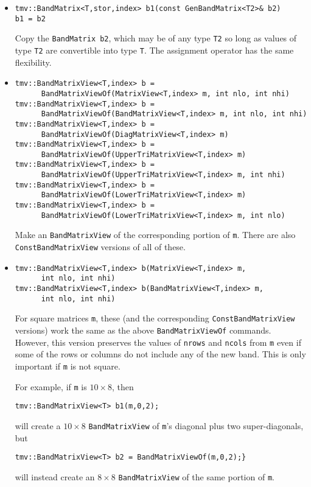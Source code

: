\documentclass[twoside,letterpaper,11pt]{article}
\renewcommand{\tt}[1]{{\texttt {#1}}}
\begin{document}
\begin{itemize}
\item
\begin{verbatim}
tmv::BandMatrix<T,stor,index> b1(const GenBandMatrix<T2>& b2)
b1 = b2
\end{verbatim}
Copy the \tt{BandMatrix b2}, which may be of any type \tt{T2} so long
as values of type \tt{T2} are convertible into type \tt{T}.
The assignment operator has the same flexibility.

\item
\begin{verbatim}
tmv::BandMatrixView<T,index> b = 
      BandMatrixViewOf(MatrixView<T,index> m, int nlo, int nhi)
tmv::BandMatrixView<T,index> b = 
      BandMatrixViewOf(BandMatrixView<T,index> m, int nlo, int nhi)
tmv::BandMatrixView<T,index> b = 
      BandMatrixViewOf(DiagMatrixView<T,index> m)
tmv::BandMatrixView<T,index> b = 
      BandMatrixViewOf(UpperTriMatrixView<T,index> m)
tmv::BandMatrixView<T,index> b = 
      BandMatrixViewOf(UpperTriMatrixView<T,index> m, int nhi)
tmv::BandMatrixView<T,index> b = 
      BandMatrixViewOf(LowerTriMatrixView<T,index> m)
tmv::BandMatrixView<T,index> b = 
      BandMatrixViewOf(LowerTriMatrixView<T,index> m, int nlo)
\end{verbatim}
Make an \tt{BandMatrixView} of the corresponding portion of \tt{m}.  
There are also \tt{ConstBandMatrixView} versions of all of these.  

\item
\begin{verbatim}
tmv::BandMatrixView<T,index> b(MatrixView<T,index> m, 
      int nlo, int nhi)
tmv::BandMatrixView<T,index> b(BandMatrixView<T,index> m, 
      int nlo, int nhi)
\end{verbatim}
For square matrices \tt{m}, these (and the corresponding \tt{ConstBandMatrixView}
versions) work the same as the above \tt{BandMatrixViewOf}
commands.  However, this version preserves the values of \tt{nrows} and \tt{ncols}
from \tt{m}
even if some of the rows or columns do not include any of the new band.
This is only important if \tt{m} is not square.

For example, if \tt{m} is $10 \times 8$, then 
\begin{verbatim}
tmv::BandMatrixView<T> b1(m,0,2);
\end{verbatim}
will create a $10 \times 8$ \tt{BandMatrixView} of \tt{m}'s diagonal plus two super-diagonals, but
\begin{verbatim}
tmv::BandMatrixView<T> b2 = BandMatrixViewOf(m,0,2);}
\end{verbatim}
will instead create an $8 \times 8$ \tt{BandMatrixView} of the same portion of \tt{m}.


\end{itemize}
\end{document}
